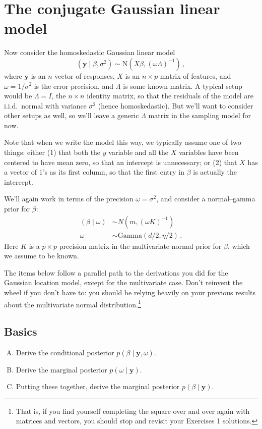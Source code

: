 \documentclass{mynotes}
\newcommand{\by}{\textbf{y}}
\newcommand{\N}{\mbox{N}}
\begin{document}
\newpage 

\section{The conjugate Gaussian linear model}

Now consider the homoskedastic Gaussian linear model
$$
(\by \mid \beta, \sigma^2) \sim \N(X\beta, (\omega \Lambda)^{-1} ) \, ,
$$
where $\by$ is an $n$ vector of responses, $X$ is an $n \times p$ matrix of features, and $\omega = 1/\sigma^2$ is the error precision, and $\Lambda$ is some known matrix.  A typical setup would be $\Lambda = I$, the $n \times n$ identity matrix, so that the residuals of the model are i.i.d.~normal with variance $\sigma^2$ (hence homoskedastic).  But we'll want to consider other setups as well, so we'll leave a generic $\Lambda$ matrix in the sampling model for now.

Note that when we write the model this way, we typically assume one of two things: either (1) that both the $y$ variable and all the $X$ variables have been centered to have mean zero, so that an intercept is unnecessary; or (2) that $X$ has a vector of 1's as its first column, so that the first entry in $\beta$ is actually the intercept.

We'll again work in terms of the precision $\omega = \sigma^2$, and consider a normal--gamma prior for $\beta$:
\begin{align}
(\beta \mid \omega) &\sim N(m, (\omega K)^{-1}) \\
\omega &\sim \mbox{Gamma}(d/2, \eta/2) \, .
\end{align}
Here $K$ is a $p \times p$ precision matrix in the multivariate normal prior for $\beta$, which we assume to be known.

The items below follow a parallel path to the derivations you did for the Gaussian location model, except for the multivariate case.  Don't reinvent the wheel if you don't have to: you should be relying heavily on your previous results about the multivariate normal distribution.\footnote{That is, if you find yourself completing the square over and over again with matrices and vectors, you should stop and revisit your Exercises 1 solutions.}

\subsection{Basics}

\begin{enumerate}[(A)]

\item Derive the conditional posterior $p(\beta \mid \by, \omega)$.

\item Derive the marginal posterior $p(\omega \mid \by)$.

\item Putting these together, derive the marginal posterior $p(\beta \mid \by)$.

\end{enumerate}
\end{document}
